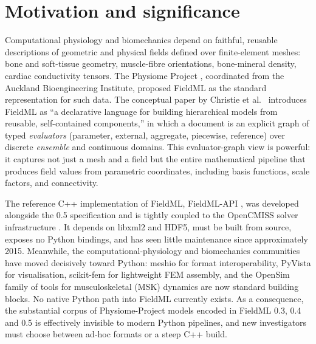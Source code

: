 \documentclass[preprint,12pt,a4paper]{elsarticle}
\begin{document}
\section{Motivation and significance}

Computational physiology and biomechanics depend on faithful, reusable descriptions of geometric and physical fields defined over finite-element meshes: bone and soft-tissue geometry, muscle-fibre orientations, bone-mineral density, cardiac conductivity tensors. The Physiome Project \cite{hunter_borg_2003}, coordinated from the Auckland Bioengineering Institute, proposed FieldML as the standard representation for such data. The conceptual paper by Christie et al.~\cite{fieldml_christie_2009} introduces FieldML as ``a declarative language for building hierarchical models from reusable, self-contained components,'' in which a document is an explicit graph of typed \emph{evaluators} (parameter, external, aggregate, piecewise, reference) over discrete \emph{ensemble} and continuous domains. This evaluator-graph view is powerful: it captures not just a mesh and a field but the entire mathematical pipeline that produces field values from parametric coordinates, including basis functions, scale factors, and connectivity.

The reference C++ implementation of FieldML, FieldML-API \cite{fieldml_api}, was developed alongside the 0.5 specification and is tightly coupled to the OpenCMISS solver infrastructure \cite{bradley_opencmiss_2011}. It depends on libxml2 and HDF5, must be built from source, exposes no Python bindings, and has seen little maintenance since approximately 2015. Meanwhile, the computational-physiology and biomechanics communities have moved decisively toward Python: meshio \cite{meshio} for format interoperability, PyVista \cite{pyvista} for visualisation, scikit-fem \cite{scikit_fem} for lightweight FEM assembly, and the OpenSim \cite{delp_opensim_2007,seth_opensim_2018} family of tools for musculoskeletal (MSK) dynamics are now standard building blocks. No native Python path into FieldML currently exists. As a consequence, the substantial corpus of Physiome-Project models encoded in FieldML 0.3, 0.4 and 0.5 is effectively invisible to modern Python pipelines, and new investigators must choose between ad-hoc formats or a steep C++ build.
\end{document}
